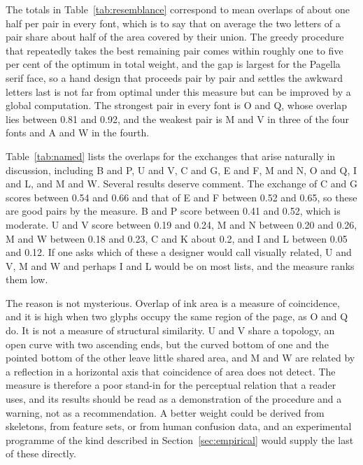 \begin{table}[ht]
\centering
\footnotesize

\caption{Maximum-weight reciprocal pairings of the 26 capitals under the pixel-overlap measure, by typeface. The greedy column takes the best remaining pair repeatedly. Overlap values are Jaccard indices.}\label{tab:resemblance}
\end{table}

The totals in Table~\ref{tab:resemblance} correspond to mean overlaps of about one half per pair in every font, which is to say that on average the two letters of a pair share about half of the area covered by their union. The greedy procedure that repeatedly takes the best remaining pair comes within roughly one to five per cent of the optimum in total weight, and the gap is largest for the Pagella serif face, so a hand design that proceeds pair by pair and settles the awkward letters last is not far from optimal under this measure but can be improved by a global computation. The strongest pair in every font is O and Q, whose overlap lies between 0.81 and 0.92, and the weakest pair is M and V in three of the four fonts and A and W in the fourth.

Table~\ref{tab:named} lists the overlaps for the exchanges that arise naturally in discussion, including B and P, U and V, C and G, E and F, M and N, O and Q, I and L, and M and W. Several results deserve comment. The exchange of C and G scores between 0.54 and 0.66 and that of E and F between 0.52 and 0.65, so these are good pairs by the measure. B and P score between 0.41 and 0.52, which is moderate. U and V score between 0.19 and 0.24, M and N between 0.20 and 0.26, M and W between 0.18 and 0.23, C and K about 0.2, and I and L between 0.05 and 0.12. If one asks which of these a designer would call visually related, U and V, M and W and perhaps I and L would be on most lists, and the measure ranks them low.

\begin{table}[ht]
\centering
\small

\caption{Pixel overlap for selected pairs, by typeface.}\label{tab:named}
\end{table}

The reason is not mysterious. Overlap of ink area is a measure of coincidence, and it is high when two glyphs occupy the same region of the page, as O and Q do. It is not a measure of structural similarity. U and V share a topology, an open curve with two ascending ends, but the curved bottom of one and the pointed bottom of the other leave little shared area, and M and W are related by a reflection in a horizontal axis that coincidence of area does not detect. The measure is therefore a poor stand-in for the perceptual relation that a reader uses, and its results should be read as a demonstration of the procedure and a warning, not as a recommendation. A better weight could be derived from skeletons, from feature sets, or from human confusion data, and an experimental programme of the kind described in Section~\ref{sec:empirical} would supply the last of these directly.

